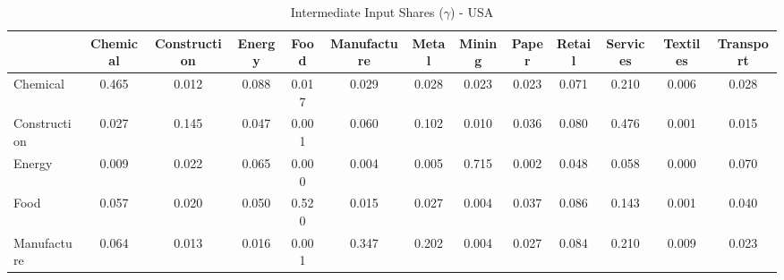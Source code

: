 \begin{table}[htbp]
\centering
\caption{Intermediate Input Shares ($\gamma$) - USA} 
\label{tab:gamma_USA}
\begin{tabular}{lcccccccccccc}
  \hline
 & Chemical & Construction & Energy & Food & Manufacture & Metal & Mining & Paper & Retail & Services & Textiles & Transport \\ 
  \hline
Chemical & \textcolor[RGB]{9,6,246}{0.465} & \textcolor[RGB]{198,128,57}{0.012} & \textcolor[RGB]{55,36,200}{0.088} & \textcolor[RGB]{181,117,74}{0.017} & \textcolor[RGB]{140,91,115}{0.029} & \textcolor[RGB]{147,95,108}{0.028} & \textcolor[RGB]{166,108,89}{0.023} & \textcolor[RGB]{170,110,85}{0.023} & \textcolor[RGB]{67,44,188}{0.071} & \textcolor[RGB]{30,19,225}{0.210} & \textcolor[RGB]{212,138,42}{0.006} & \textcolor[RGB]{143,93,112}{0.028} \\ 
  Construction & \textcolor[RGB]{152,99,103}{0.027} & \textcolor[RGB]{37,24,218}{0.145} & \textcolor[RGB]{106,69,149}{0.047} & \textcolor[RGB]{236,152,19}{0.001} & \textcolor[RGB]{80,52,175}{0.060} & \textcolor[RGB]{46,30,209}{0.102} & \textcolor[RGB]{204,132,51}{0.010} & \textcolor[RGB]{129,84,126}{0.036} & \textcolor[RGB]{60,39,195}{0.080} & \textcolor[RGB]{7,5,248}{0.476} & \textcolor[RGB]{232,150,23}{0.001} & \textcolor[RGB]{189,123,66}{0.015} \\ 
  Energy & \textcolor[RGB]{209,135,46}{0.009} & \textcolor[RGB]{172,111,83}{0.022} & \textcolor[RGB]{73,47,182}{0.065} & \textcolor[RGB]{251,163,4}{0.000} & \textcolor[RGB]{220,142,35}{0.004} & \textcolor[RGB]{214,139,41}{0.005} & \textcolor[RGB]{0,0,255}{0.715} & \textcolor[RGB]{225,146,30}{0.002} & \textcolor[RGB]{103,66,152}{0.048} & \textcolor[RGB]{81,53,174}{0.058} & \textcolor[RGB]{253,164,2}{0.000} & \textcolor[RGB]{69,45,186}{0.070} \\ 
  Food & \textcolor[RGB]{83,54,172}{0.057} & \textcolor[RGB]{175,113,80}{0.020} & \textcolor[RGB]{96,62,159}{0.050} & \textcolor[RGB]{4,2,251}{0.520} & \textcolor[RGB]{186,120,69}{0.015} & \textcolor[RGB]{151,97,104}{0.027} & \textcolor[RGB]{223,144,32}{0.004} & \textcolor[RGB]{128,82,128}{0.037} & \textcolor[RGB]{57,37,198}{0.086} & \textcolor[RGB]{39,25,216}{0.143} & \textcolor[RGB]{237,154,18}{0.001} & \textcolor[RGB]{120,78,135}{0.040} \\ 
  Manufacture & \textcolor[RGB]{76,49,179}{0.064} & \textcolor[RGB]{197,127,58}{0.013} & \textcolor[RGB]{182,118,73}{0.016} & \textcolor[RGB]{243,157,12}{0.001} & \textcolor[RGB]{16,10,239}{0.347} & \textcolor[RGB]{32,21,223}{0.202} & \textcolor[RGB]{221,143,34}{0.004} & \textcolor[RGB]{149,96,106}{0.027} & \textcolor[RGB]{58,38,197}{0.084} & \textcolor[RGB]{27,17,228}{0.210} & \textcolor[RGB]{207,134,48}{0.009} & \textcolor[RGB]{165,107,90}{0.023} \\ 

\end{tabular}
\end{table}
